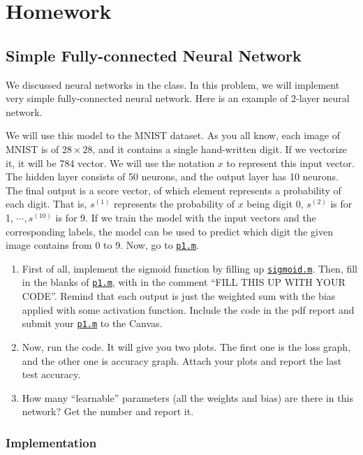\section{Homework \thesection}

\subsection{Simple Fully-connected Neural Network}
We discussed neural networks in the class. In this problem, we will implement very simple fully-connected neural network. Here is
an example of 2-layer neural network.

We will use this model to the MNIST dataset.
As you all know, each image of MNIST is of \(28 \times 28\), and it contains a single hand-written digit.
If we vectorize it, it will be 784 vector.
We will use the notation \(x\) to represent this input vector.
The hidden layer consists of 50 neurons, and the output layer has 10 neurons.
The final output is a score vector, of which element represents a probability of each digit.
That is, \(s^{(1)}\) represents the probability of \(x\) being digit 0, \(s^{(2)}\) is for 1, \(\cdots, s^{(10)}\) is for 9.
If we train the model with the input vectors and the corresponding labels, the model can be used to predict which digit the given image contains from 0 to 9.
Now, go to \href{./hw6/p1.m}{\texttt{p1.m}}.
\begin{enumerate}
    \item First of all, implement the sigmoid function by filling up \href{./hw5/sigmoid.m}{\texttt{sigmoid.m}}.
    Then, fill in the blanks of \href{./hw6/p1.m}{\texttt{p1.m}}, with in the comment ``FILL THIS UP WITH YOUR CODE''.
    Remind that each output is just the weighted sum with the bias applied with some activation function.
    Include the code in the pdf report and submit your \href{./hw6/p1.m}{\texttt{p1.m}} to the Canvas.
    \item Now, run the code.
    It will give you two plots.
    The first one is the loss graph, and the other one is accuracy graph.
    Attach your plots and report the last test accuracy.
    \item How many ``learnable'' parameters (all the weights and bias) are there in this network?
    Get the number and report it.
\end{enumerate}
\subsubsection{Implementation}


